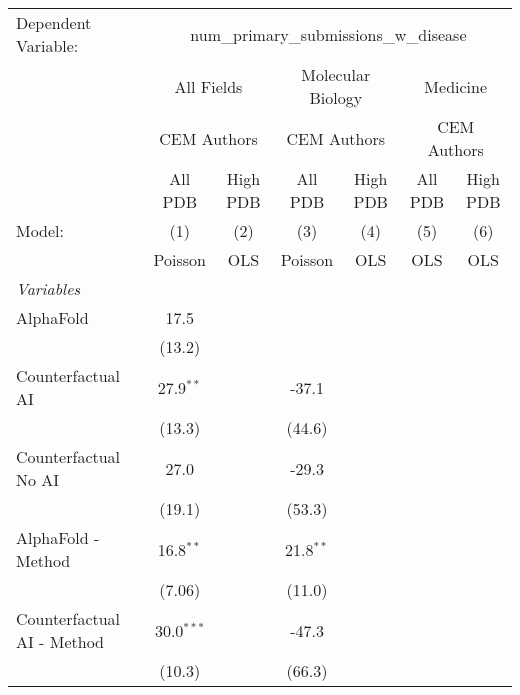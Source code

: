 \begingroup
\centering
\begin{tabular}{lcccccc}
   \tabularnewline \midrule \midrule
   Dependent Variable: & \multicolumn{6}{c}{num\_primary\_submissions\_w\_disease}\\
 & \multicolumn{2}{c}{All Fields} & \multicolumn{2}{c}{Molecular Biology} & \multicolumn{2}{c}{Medicine} \\
\cmidrule(lr){2-3} \cmidrule(lr){4-5} \cmidrule(lr){6-7}
 & \multicolumn{2}{c}{CEM Authors} & \multicolumn{2}{c}{CEM Authors} & \multicolumn{2}{c}{CEM Authors} \\
\cmidrule(lr){2-3} \cmidrule(lr){4-5} \cmidrule(lr){6-7}
 & \multicolumn{1}{c}{All PDB} & \multicolumn{1}{c}{High PDB} & \multicolumn{1}{c}{All PDB} & \multicolumn{1}{c}{High PDB} & \multicolumn{1}{c}{All PDB} & \multicolumn{1}{c}{High PDB} \\
\cmidrule(lr){2-2} \cmidrule(lr){3-3} \cmidrule(lr){4-4} \cmidrule(lr){5-5} \cmidrule(lr){6-6} \cmidrule(lr){7-7}
   Model:                        & (1)          & (2)  & (3)         & (4)  & (5)  & (6)\\  
                                 &  Poisson     & OLS  & Poisson     & OLS  & OLS  & OLS\\  
   \midrule
   \emph{Variables}\\
   AlphaFold                     & 17.5         &      &             &      &      &   \\   
                                 & (13.2)       &      &             &      &      &   \\   
   Counterfactual AI             & 27.9$^{**}$  &      & -37.1       &      &      &   \\   
                                 & (13.3)       &      & (44.6)      &      &      &   \\   
   Counterfactual No AI          & 27.0         &      & -29.3       &      &      &   \\   
                                 & (19.1)       &      & (53.3)      &      &      &   \\   
   AlphaFold - Method            & 16.8$^{**}$  &      & 21.8$^{**}$ &      &      &   \\   
                                 & (7.06)       &      & (11.0)      &      &      &   \\   
   Counterfactual AI - Method    & 30.0$^{***}$ &      & -47.3       &      &      &   \\   
                                 & (10.3)       &      & (66.3)      &      &      &   \\   

\end{tabular}
